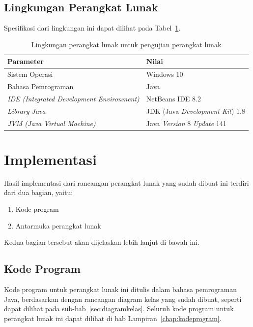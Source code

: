 \subsection{Lingkungan Perangkat Lunak}
\label{sec:lingkunganlunak}

Spesifikasi dari lingkungan ini dapat dilihat pada Tabel~\ref{tab:lingkunganpl}.

\begin{table}
\centering
\captionsetup{justification=centering}
\caption[Lingkungan perangkat lunak untuk pengujian perangkat lunak]{Lingkungan perangkat lunak untuk pengujian perangkat lunak}
\begin{tabular}{| l | l |}
\hline
Parameter & Nilai \\
\hline \hline
Sistem Operasi & Windows 10 \\
\hline
Bahasa Pemrograman & Java \\
\hline
\textit{IDE (Integrated Development Environment)} & NetBeans IDE 8.2 \\
\hline
\textit{Library Java} & JDK (Java \textit{Development Kit}) 1.8 \\
\hline
\textit{JVM (Java Virtual Machine)} & Java \textit{Version} 8 \textit{Update} 141 \\
\hline
\end{tabular}
\label{tab:lingkunganpl}
\end{table}

\section{Implementasi}
\label{sec:implementasi}

Hasil implementasi dari rancangan perangkat lunak yang sudah dibuat ini terdiri dari dua bagian, yaitu:

\begin{enumerate}
\item Kode program
\item Antarmuka perangkat lunak
\end{enumerate}

Kedua bagian tersebut akan dijelaskan lebih lanjut di bawah ini.

\subsection{Kode Program}
\label{sec:kodeprogram}

Kode program untuk perangkat lunak ini ditulis dalam bahasa pemrograman Java, berdasarkan dengan rancangan diagram kelas yang sudah dibuat, seperti dapat dilihat pada sub-bab~\ref{sec:diagramkelas}. Seluruh kode program untuk perangkat lunak ini dapat dilihat di bab Lampiran~\ref{chap:kodeprogram}.

